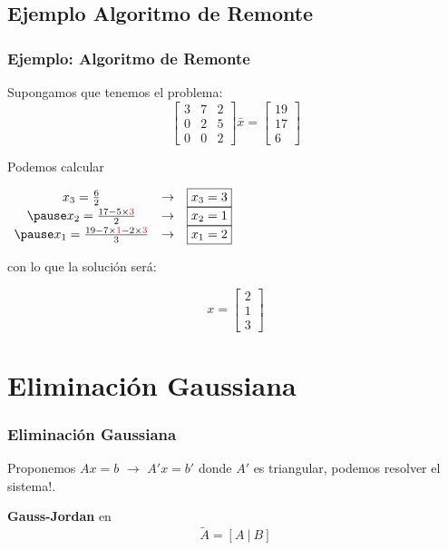 \documentclass[xcolor=svgnames]{beamer} %
\theoremstyle{plain}
\renewcommand{\textbf}[1]{{\bfseries\textcolor{redUnq2}{#1}}}
\theoremstyle{definition}
\begin{document}
\subsection{Ejemplo Algoritmo de Remonte}


\begin{frame}
\frametitle{Ejemplo: Algoritmo de Remonte}

Supongamos que tenemos el problema:
$$  \begin{bmatrix}
3 & 7 & 2 \\
0 & 2 & 5 \\
0 & 0 & 2
\end{bmatrix} \bar x = \begin{bmatrix}
19\\
17\\
6
\end{bmatrix} $$

\begin{minipage}{.55\linewidth}
Podemos calcular 

\pause
$\begin{array}{ccc}
x_3 = \frac{6}{2} &\rightarrow& \boxed{ x_3= 3}\\
\pause
x_2 = \frac{17 - 5\times {\color{red}3} }{2} &\rightarrow& \boxed{ x_2= 1} \\\pause
x_1 = \frac{19 -7\times {\color{red}1} -2\times {\color{red}3}}{3} & \rightarrow &
\boxed{x_1 =2 }
\end{array} $
\end{minipage}\pause \vrule \begin{minipage}{.34\linewidth}
con lo que la solución será:

$$x = \begin{bmatrix}
2\\
1\\
3
\end{bmatrix}$$

\end{minipage}
\end{frame}

\section{Eliminación Gaussiana}

\begin{frame}
\frametitle{Eliminación Gaussiana}
Proponemos $A x=b$ $\rightarrow$  $A' x = b'$  donde $A'$ es triangular, podemos resolver el sistema!.\vspace{10pt}

\pause
\begin{tcolorbox}

\textbf{Gauss-Jordan} en 
$$\tilde A = [A\ |\ B] $$

\end{tcolorbox}
\pause
{\centering \textbf{Luego Remonte o Descenso}} 
\end{frame}
\end{document}
